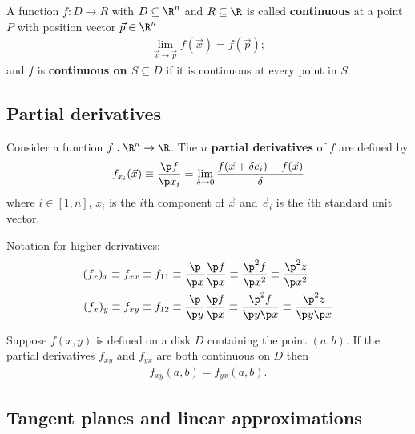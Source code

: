 \documentclass{article}
\begin{document}
\begin{definition}
	A function $f:D\to R$ with $D\subseteq\R^n$ and $R\subseteq\R$
	is called \textbf{continuous} at a point $P$ with position vector $\vec p\in \R^n$
	\begin{align*}
		\lim_{\vec x\to \vec p}f(\vec x) = f(\vec p);
	\end{align*}
	and $f$ is \textbf{continuous on $S\subseteq D$} if it is continuous at
	every point in $S$.
\end{definition}


\subsection{Partial derivatives}


\begin{definition}
	Consider a function $f:\R^n\to\R$. The $n$ \textbf{partial derivatives} of
	$f$ are defined by
	\begin{align*}
		f_{x_i}(\vec x)\equiv\frac{\p f}{\p x_i}=\lim_{\delta\to 0}\frac{f(\vec x + \delta \vec e_i)-f(\vec x)}{\delta}
	\end{align*}
	where $i\in[1,n]$, $x_i$ is the $i$th component of $\vec x$ and $\vec e_i$ is the
	$i$th standard unit vector.
\end{definition}
Notation for higher derivatives:
\begin{align*}
	(f_x)_x \equiv f_{xx} \equiv f_{11}
	 & \equiv \frac{\p}{\p x}\frac{\p f}{\p x}
	\equiv \frac{\p^2 f}{\p x^2}
	\equiv \frac{\p^2 z}{\p x^2}               \\
	(f_x)_y \equiv f_{xy} \equiv f_{12}
	 & \equiv \frac{\p}{\p y}\frac{\p f}{\p x}
	\equiv \frac{\p^2 f}{\p y \p x}
	\equiv \frac{\p^2 z}{\p y \p x}            \\
\end{align*}
\begin{theorem}
	Suppose $f(x,y)$ is defined on a disk $D$ containing the point $(a,b)$.
	If the partial derivatives $f_{xy}$ and $f_{yx}$ are both continuous
	on $D$ then
	\begin{align*}
		f_{xy}(a,b)=f_{yx}(a,b).
	\end{align*}
\end{theorem}


\subsection{Tangent planes and linear approximations}
\end{document}
